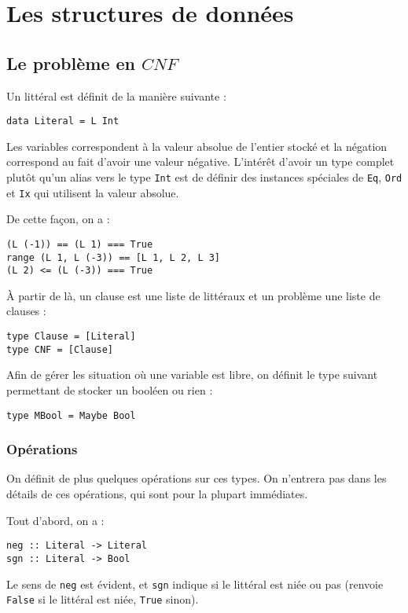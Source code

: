 \section{Les structures de données}
\subsection{Le problème en $CNF$}
Un littéral est définit de la manière suivante :
\begin{lstlisting}
data Literal = L Int
\end{lstlisting}

Les variables correspondent à la valeur absolue de l'entier stocké et la
négation correspond au fait d'avoir une valeur négative. L'intérêt d'avoir un
type complet plutôt qu'un alias vers le type \texttt{Int} est de définir
des instances spéciales de \texttt{Eq}, \texttt{Ord} et \texttt{Ix} qui
utilisent la valeur absolue.

De cette façon, on a :
\begin{lstlisting}
(L (-1)) == (L 1) === True
range (L 1, L (-3)) == [L 1, L 2, L 3]
(L 2) <= (L (-3)) === True
\end{lstlisting}

À partir de là, un clause est une liste de littéraux et un problème une liste
de clauses :
\begin{lstlisting}
type Clause = [Literal]
type CNF = [Clause]
\end{lstlisting}

Afin de gérer les situation où une variable est libre, on définit le type
suivant permettant de stocker un booléen ou rien :
\begin{lstlisting}
type MBool = Maybe Bool
\end{lstlisting}

\subsubsection{Opérations}
On définit de plus quelques opérations sur ces types. On n'entrera pas dans les
détails de ces opérations, qui sont pour la plupart immédiates.

Tout d'abord, on a :
\begin{lstlisting}
neg :: Literal -> Literal
sgn :: Literal -> Bool
\end{lstlisting}

Le sens de \texttt{neg} est évident, et \texttt{sgn} indique si le littéral
est niée ou pas (renvoie \texttt{False} si le littéral est niée, \texttt{True}
sinon).

